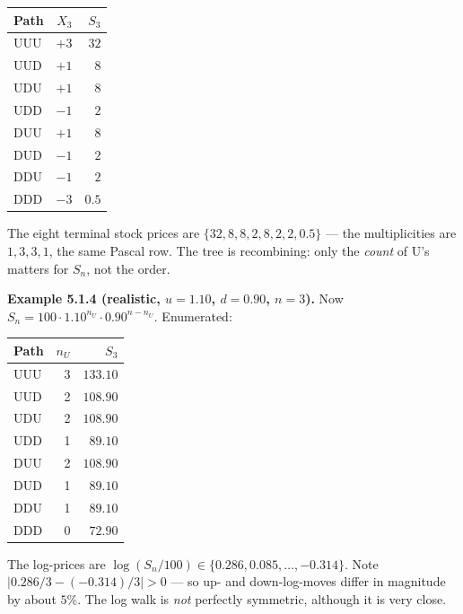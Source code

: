 \documentclass[
  10pt,
  twoside]{book}
\newcounter{none} %
\begin{document}
{\def\LTcaptype{none} %
\begin{table}[H]
\centering
\begin{tabular}{|l|r|r|}
\toprule
Path & \(X_3\) & \(S_3\) \\
\midrule



UUU & \(+3\) & \(32\) \\
UUD & \(+1\) & \(8\) \\
UDU & \(+1\) & \(8\) \\
UDD & \(-1\) & \(2\) \\
DUU & \(+1\) & \(8\) \\
DUD & \(-1\) & \(2\) \\
DDU & \(-1\) & \(2\) \\
DDD & \(-3\) & \(0.5\) \\
\bottomrule
\end{tabular}
\end{table}
}

The eight terminal stock prices are \(\{32, 8, 8, 2, 8, 2, 2, 0.5\}\)
--- the multiplicities are \(1, 3, 3, 1\), the same Pascal row. The tree
is recombining: only the \emph{count} of U's matters for \(S_n\), not
the order.

\textbf{Example 5.1.4 (realistic, \(u=1.10\), \(d=0.90\), \(n=3\)).} Now
\(S_n = 100 \cdot 1.10^{n_U} \cdot 0.90^{n - n_U}\). Enumerated:

{\def\LTcaptype{none} %
\begin{table}[H]
\centering
\begin{tabular}{|l|r|r|}
\toprule
Path & \(n_U\) & \(S_3\) \\
\midrule



UUU & 3 & \(133.10\) \\
UUD & 2 & \(108.90\) \\
UDU & 2 & \(108.90\) \\
UDD & 1 & \(89.10\) \\
DUU & 2 & \(108.90\) \\
DUD & 1 & \(89.10\) \\
DDU & 1 & \(89.10\) \\
DDD & 0 & \(72.90\) \\
\bottomrule
\end{tabular}
\end{table}
}

The log-prices are
\(\log(S_n/100) \in \{0.286, 0.085, \ldots, -0.314\}\). Note
\(|0.286 / 3 - (-0.314)/3| > 0\) --- so up- and down-log-moves differ in
magnitude by about \(5\%\). The log walk is \emph{not} perfectly
symmetric, although it is very close.
\end{document}
